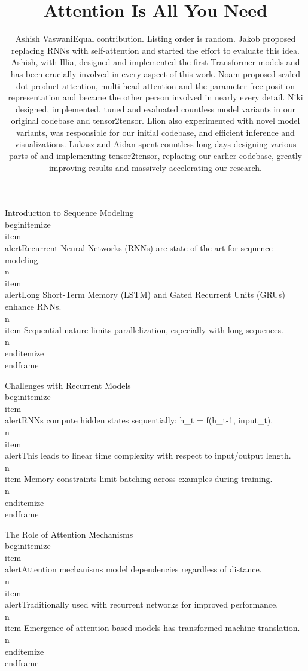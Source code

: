 \documentclass{beamer}
\title{Attention Is All You Need}
\author{Ashish VaswaniEqual contribution. Listing order is random. Jakob proposed replacing RNNs with self-attention and started the effort to evaluate this idea. Ashish, with Illia, designed and implemented the first Transformer models and has been crucially involved in every aspect of this work. Noam proposed scaled dot-product attention, multi-head attention and the parameter-free position representation and became the other person involved in nearly every detail. Niki designed, implemented, tuned and evaluated countless model variants in our original codebase and tensor2tensor. Llion also experimented with novel model variants, was responsible for our initial codebase, and efficient inference and visualizations. Lukasz and Aidan spent countless long days designing various parts of and implementing tensor2tensor, replacing our earlier codebase, greatly improving results and massively accelerating our research.}
\begin{document}
\frame{\titlepage}
\begingroup
{}\n{}\n\begin{frame}[]{Introduction to Sequence Modeling}\n\\begin{itemize}
\\item \\alert{Recurrent Neural Networks (RNNs) are state-of-the-art for sequence modeling.}\\n\\item \\alert{Long Short-Term Memory (LSTM) and Gated Recurrent Units (GRUs) enhance RNNs.}\\n\\item Sequential nature limits parallelization, especially with long sequences.\\n\\end{itemize}
\\end{frame}

\endgroup

\begingroup
{}\n{}\n\begin{frame}[]{Challenges with Recurrent Models}\n\\begin{itemize}
\\item \\alert{RNNs compute hidden states sequentially: h\_t = f(h\_t-1, input\_t).}\\n\\item \\alert{This leads to linear time complexity with respect to input/output length.}\\n\\item Memory constraints limit batching across examples during training.\\n\\end{itemize}
\\end{frame}

\endgroup

\begingroup
{}\n{}\n\begin{frame}[]{The Role of Attention Mechanisms}\n\\begin{itemize}
\\item \\alert{Attention mechanisms model dependencies regardless of distance.}\\n\\item \\alert{Traditionally used with recurrent networks for improved performance.}\\n\\item Emergence of attention-based models has transformed machine translation.\\n\\end{itemize}
\\end{frame}


\end{frame}
\end{frame}
\end{frame}
\end{document}
